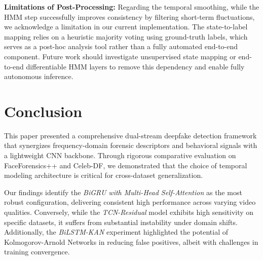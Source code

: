 \documentclass[conference]{IEEEtran}
\begin{document}
\textbf{Limitations of Post-Processing:} Regarding the temporal smoothing, while the HMM step successfully improves consistency by filtering short-term fluctuations, we acknowledge a limitation in our current implementation. The state-to-label mapping relies on a heuristic majority voting using ground-truth labels, which serves as a post-hoc analysis tool rather than a fully automated end-to-end component. Future work should investigate unsupervised state mapping or end-to-end differentiable HMM layers to remove this dependency and enable fully autonomous inference.



\section{Conclusion}
This paper presented a comprehensive dual-stream deepfake detection framework that synergizes frequency-domain forensic descriptors and behavioral signals with a lightweight CNN backbone. Through rigorous comparative evaluation on FaceForensics++ and Celeb-DF, we demonstrated that the choice of temporal modeling architecture is critical for cross-dataset generalization.

Our findings identify the \textit{BiGRU with Multi-Head Self-Attention} as the most robust configuration, delivering consistent high performance across varying video qualities. Conversely, while the \textit{TCN-Residual} model exhibits high sensitivity on specific datasets, it suffers from substantial instability under domain shifts. Additionally, the \textit{BiLSTM-KAN} experiment highlighted the potential of Kolmogorov-Arnold Networks in reducing false positives, albeit with challenges in training convergence.
\end{document}
